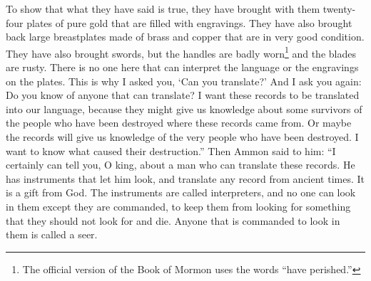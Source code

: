 To show that what they have said is true, they have brought with them twenty-four plates of pure gold that are filled with engravings.
\bverse \iffalse And behold, also, they have brought breastplates, which are large, and they are of brass and of copper, and are perfectly sound. \fi
They have also brought back large breastplates made of brass and copper that are in very good condition.
\bverse \iffalse And again, they have brought swords, the hilts thereof have perished, and the blades thereof were cankered with rust; and there is no one in the land that is able to interpret the language or the engravings that are on the plates. Therefore I said unto thee: Canst thou translate? \fi
They have also brought swords, but the handles are badly worn\footnote{The official version of the Book of Mormon uses the words ``have perished.''} and the blades are rusty. There is no one here that can interpret the language or the engravings on the plates. This is why I asked you, \lq Can you translate?\rq
\bverse \iffalse And I say unto thee again: Knowest thou of any one that can translate? For I am desirous that these records should be translated into our language; for, perhaps, they will give us a knowledge of a remnant of the people who have been destroyed, from whence these records came; or, perhaps, they will give us a knowledge of this very people who have been destroyed; and I am desirous to know the cause of their destruction. \fi
And I ask you again: Do you know of anyone that can translate? I want these records to be translated into our language, because they might give us knowledge about some survivors of the people who have been destroyed where these records came from. Or maybe the records will give us knowledge of the very people who have been destroyed. I want to know what caused their destruction.''
\bverse \iffalse Now Ammon said unto him: I can assuredly tell thee, O king, of a man that can translate the records; for he has wherewith that he can look, and translate all records that are of ancient date; and it is a gift from God. And the things are called interpreters, and no man can look in them except he be commanded, lest he should look for that he ought not and he should perish.  And whosoever is commanded to look in them, the same is called seer. \fi
Then Ammon said to him: ``I certainly can tell you, O king, about a man who can translate these records. He has instruments that let him look, and translate any record from ancient times. It is a gift from God. The instruments are called interpreters, and no one can look in them except they are commanded, to keep them from looking for something that they should not look for and die. Anyone that is commanded to look in them is called a seer.
